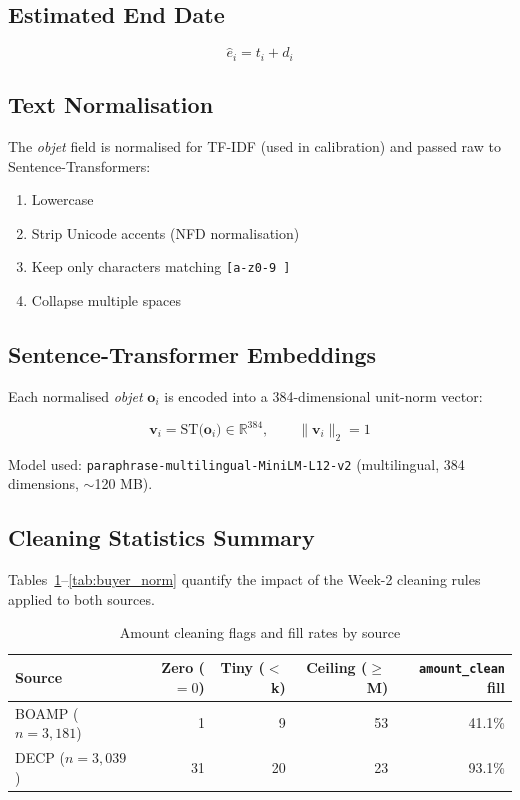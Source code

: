 \documentclass[12pt, a4paper]{article}
\begin{document}
\subsection{Estimated End Date}

\begin{equation}
  \hat{e}_i = t_i + d_i
\end{equation}

\subsection{Text Normalisation}

The \textit{objet} field is normalised for TF-IDF (used in calibration) and
passed raw to Sentence-Transformers:

\begin{enumerate}
  \item Lowercase
  \item Strip Unicode accents (NFD normalisation)
  \item Keep only characters matching \texttt{[a-z0-9 ]}
  \item Collapse multiple spaces
\end{enumerate}

\subsection{Sentence-Transformer Embeddings}

Each normalised \textit{objet} $\mathbf{o}_i$ is encoded into a 384-dimensional
unit-norm vector:

\begin{equation}
  \mathbf{v}_i = \text{ST}\bigl(\mathbf{o}_i\bigr) \in \mathbb{R}^{384},
  \qquad \|\mathbf{v}_i\|_2 = 1
\end{equation}

Model used: \texttt{paraphrase-multilingual-MiniLM-L12-v2}
(multilingual, 384 dimensions, $\sim$120 MB).

\subsection{Cleaning Statistics Summary}
\label{sec:cleaning_stats}

Tables~\ref{tab:amount_cleaning}--\ref{tab:buyer_norm} quantify the impact of the
Week-2 cleaning rules applied to both sources.

\begin{table}[H]
\centering
\caption{Amount cleaning flags and fill rates by source}
\label{tab:amount_cleaning}
\small
\begin{tabular}{@{}l rrrr@{}}
\toprule
Source & Zero ($=0$) & Tiny ($<$\texteuro1\,k) & Ceiling ($\geq$\texteuro10\,M) & \texttt{amount\_clean} fill \\
\midrule
BOAMP ($n=3{,}181$) & 1 & 9 & 53 & 41.1\% \\
DECP  ($n=3{,}039$) & 31 & 20 & 23 & 93.1\% \\
\bottomrule
\end{tabular}
\normalsize
\end{table}
\end{document}
